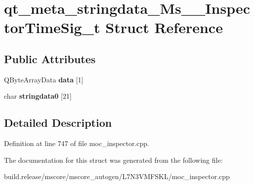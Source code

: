 \hypertarget{structqt__meta__stringdata___ms_____inspector_time_sig__t}{}\section{qt\+\_\+meta\+\_\+stringdata\+\_\+\+Ms\+\_\+\+\_\+\+Inspector\+Time\+Sig\+\_\+t Struct Reference}
\label{structqt__meta__stringdata___ms_____inspector_time_sig__t}
\subsection*{Public Attributes}
\begin{DoxyCompactItemize}
\item 
\mbox{\label{structqt__meta__stringdata___ms_____inspector_time_sig__t_a2493bb82825c6679999419c24b14fc16}} 
Q\+Byte\+Array\+Data {\bfseries data} \mbox{[}1\mbox{]}
\item 
\mbox{\label{structqt__meta__stringdata___ms_____inspector_time_sig__t_a4c19bc91b910731fd68111bb5950a250}} 
char {\bfseries stringdata0} \mbox{[}21\mbox{]}
\end{DoxyCompactItemize}


\subsection{Detailed Description}


Definition at line 747 of file moc\+\_\+inspector.\+cpp.



The documentation for this struct was generated from the following file\+:\begin{DoxyCompactItemize}
\item 
build.\+release/mscore/mscore\+\_\+autogen/\+L7\+N3\+V\+M\+F\+S\+K\+L/moc\+\_\+inspector.\+cpp\end{DoxyCompactItemize}
